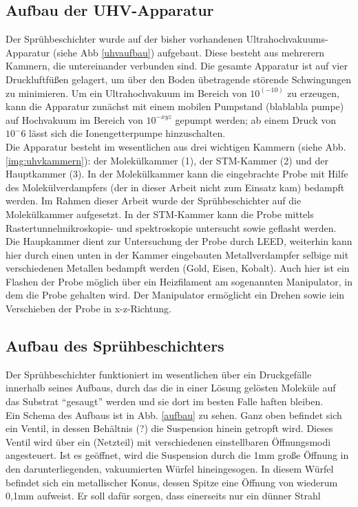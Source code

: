 \subsection{Aufbau der UHV-Apparatur}

Der Sprühbeschichter wurde auf der bisher vorhandenen Ultrahochvakuums-Apparatur (siehe Abb \ref{uhvaufbau})
aufgebaut.
Diese besteht aus mehrerern Kammern, die untereinander verbunden sind. Die gesamte Apparatur ist auf vier
Druckluftfüßen gelagert, um über den Boden übetragende störende Schwingungen zu minimieren. Um ein
Ultrahochvakuum im Bereich von $10^(-10)$ zu erzeugen, kann die Apparatur zunächst mit einem mobilen Pumpstand 
(blablabla pumpe) auf Hochvakuum im Bereich von $10^{-xyz}$ gepumpt werden; ab einem Druck von $10^-6$ lässt
sich die Ionengetterpumpe hinzuschalten.\\
Die Apparatur besteht im wesentlichen aus drei wichtigen Kammern (siehe Abb. \ref{img:uhvkammern}): der 
Molekülkammer (1), der STM-Kammer (2) und der Hauptkammer (3). In der Molekülkammer kann die eingebrachte
Probe mit Hilfe des Molekülverdampfers (der in dieser Arbeit nicht zum Einsatz kam) bedampft werden. Im Rahmen
dieser Arbeit wurde der Sprühbeschichter auf die Molekülkammer aufgesetzt. In der STM-Kammer kann die Probe
mittels Rastertunnelmikroskopie- und spektroskopie untersucht sowie geflasht werden. Die Haupkammer dient zur
Untersuchung der Probe durch LEED, weiterhin kann hier durch einen unten in der Kammer eingebauten
Metallverdampfer selbige mit verschiedenen Metallen bedampft werden (Gold, Eisen, Kobalt). Auch hier ist ein
Flashen der Probe möglich über ein Heizfilament am sogenannten Manipulator, in dem die Probe gehalten wird.
Der Manipulator ermöglicht ein Drehen sowie iein Verschieben der Probe in x-z-Richtung.\\



\subsection{Aufbau des Sprühbeschichters}

Der Sprühbeschichter funktioniert im wesentlichen über ein Druckgefälle innerhalb seines Aufbaus, durch das
die in einer Lösung gelösten Moleküle auf das Substrat "`gesaugt"' werden und sie dort im besten
Falle haften bleiben. \\
Ein Schema des Aufbaus ist in Abb. \ref{aufbau} zu sehen. Ganz oben befindet sich ein Ventil, in
dessen Behältnis (?) die Suspension hinein getropft wird. Dieses Ventil wird über ein (Netzteil) mit
verschiedenen einstellbaren Öffnungsmodi angesteuert. Ist es geöffnet, wird die Suspension durch die
1mm große Öffnung in den darunterliegenden, vakuumierten Würfel hineingesogen. In diesem Würfel
befindet sich ein metallischer Konus, dessen Spitze eine Öffnung von wiederum 0,1mm aufweist. Er
soll dafür sorgen, dass einerseits nur ein dünner Strahl 

